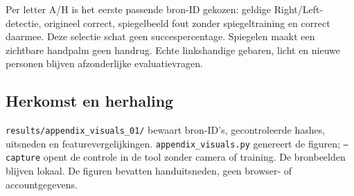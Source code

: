 Per letter A/H is het eerste passende bron-ID gekozen: geldige Right/Left-detectie, origineel correct, spiegelbeeld fout zonder spiegeltraining en correct daarmee. Deze selectie schat geen succespercentage. Spiegelen maakt een zichtbare handpalm geen handrug. Echte linkshandige gebaren, licht en nieuwe personen blijven afzonderlijke evaluatievragen.

\subsection{Herkomst en herhaling}
\texttt{results/appendix\_visuals\_01/} bewaart bron-ID's, gecontroleerde hashes, uitsneden en featurevergelijkingen. \texttt{appendix\_visuals.py} genereert de figuren; \texttt{--capture} opent de controle in de tool zonder camera of training. De bronbeelden blijven lokaal. De figuren bevatten handuitsneden, geen browser- of accountgegevens.
